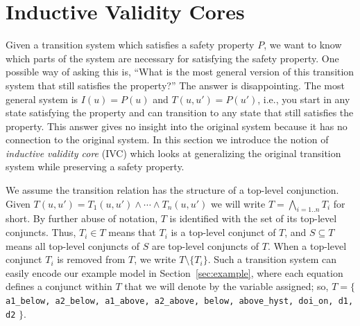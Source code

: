 \section{Inductive Validity Cores}
\label{sec:ivc}
\newcommand{\ivc}{\textit{IVC}\xspace}
\newcommand{\mivc}{\textit{MIVC}\xspace}

\newcommand{\bq}{\textsc{BaseQuery}\xspace}
\newcommand{\iq}{\textsc{IndQuery}\xspace}
\newcommand{\fq}{\textsc{FullQuery}\xspace}

\newcommand{\mink}{\textsc{MinimizeK}\xspace}
\newcommand{\reduceinv}{\textsc{ReduceInvariants}\xspace}
\newcommand{\minivc}{\textsc{MinimizeIvc}\xspace}

\newcommand{\checksat}{\textsc{CheckSat}}
\newcommand{\isadeq}{\textsc{CheckAdq}}
\newcommand{\actlit}{\textsc{ActLit}}
\newcommand{\unsatcore}{\textsc{UnsatCore}\xspace}
\newcommand{\unsat}{\texttt{UNSAT}\xspace}
\newcommand{\sat}{\texttt{SAT}\xspace}

\newcommand{\getivc}{\textsc{GetIVC}}
\newcommand{\getmodel}{\textsc{GetLiteralsFromMaxModel}}
\newcommand{\aivcalg}{\texttt{\small{All\_IVCs}}}
\newcommand{\blockup}{\textsc{BlockUp}}
\newcommand{\blockdown}{\textsc{BlockDown}}
\newcommand{\mis}{\textit{MIS}}
\newcommand{\mcs}{\textit{MCS}}

Given a transition system which satisfies a safety property $P$, we
want to know which parts of the system are necessary for satisfying
the safety property. One possible way of asking this is, ``What is the
most general version of this transition system that still satisfies
the property?'' The answer is disappointing. The most general system is
$I(u) = P(u)$ and $T(u, u') = P(u')$, i.e., you start in any state
satisfying the property and can transition to any state that still
satisfies the property. This answer gives no insight into the original
system because it has no connection to the original system. In this
section we introduce the notion of {\em inductive validity core} (IVC)
which looks at generalizing the original transition system while
preserving a safety property.

We assume the transition relation has the structure of a top-level conjunction.  Given $T(u, u') = T_1(u, u') \land \cdots \land T_n(u, u')$ we will write $T = \bigwedge_{i=1..n}T_i$ for short.
By further abuse of notation,
$T$ is identified with the set of its top-level conjuncts. Thus, $T_i \in
T$ means that $T_i$ is a top-level conjunct of $T$, and $S
\subseteq T$ means all top-level conjuncts of $S$ are top-level
conjuncts of $T$. When a top-level conjunct $T_i$ is removed from $T$, we write $T \setminus \{T_i\}$. Such a transition system can easily encode our example model in Section~\ref{sec:example}, where each equation defines a conjunct within $T$ that we will denote by the variable assigned; so, $T = \{$ {\small \texttt{a1\_below, a2\_below, a1\_above, a2\_above, below, above\_hyst, doi\_on, d1, d2}} $\}$.

